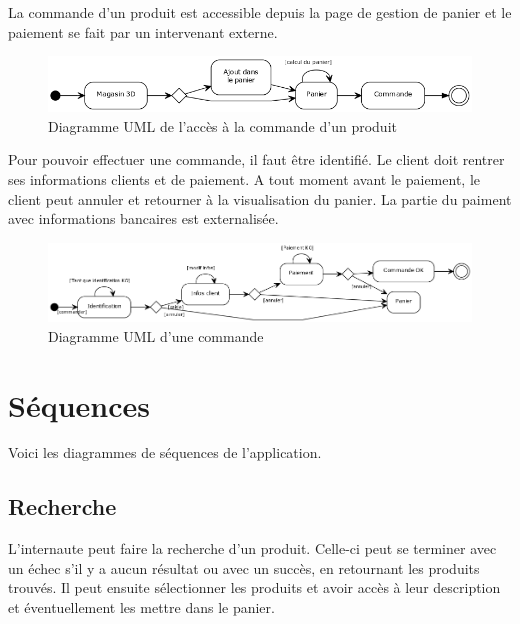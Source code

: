 \documentclass[12pt]{article}
\begin{document}
La commande d'un produit est accessible depuis la page de gestion de panier et
le paiement se fait par un intervenant externe.

\begin{figure}[ht]
    \center
    \includegraphics[scale=0.55]{../Diagrams/ActivityDiagrams/commande_global.png}
    \caption*{Diagramme UML de l'accès à la commande d'un produit}
\end{figure}

Pour pouvoir effectuer une commande, il faut être identifié.
Le client doit rentrer ses informations clients et de paiement.
A tout moment avant le paiement, le client peut annuler et retourner à la visualisation du panier.
La partie du paiment avec informations bancaires est externalisée.

\begin{figure}[ht]
    \center
    \includegraphics[scale=0.45]{../Diagrams/ActivityDiagrams/commande_en_cours.png}
    \caption*{Diagramme UML d'une commande}
\end{figure}

\newpage
\section{Séquences}

Voici les diagrammes de séquences de l'application.

\subsection{Recherche}

L'internaute peut faire la recherche d'un produit.
Celle-ci peut se terminer avec un échec s'il y a aucun résultat ou
avec un succès, en retournant les produits trouvés.
Il peut ensuite sélectionner les produits et avoir accès à leur description et
éventuellement les mettre dans le panier.
\end{document}
